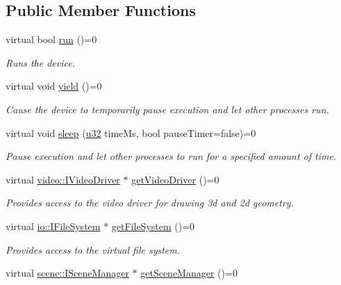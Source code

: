 \subsection*{Public Member Functions}
\begin{DoxyCompactItemize}
\item 
virtual bool \hyperlink{classirr_1_1IrrlichtDevice_a0489f8151dc43f6f41503ffb5a160b35}{run} ()=0
\begin{DoxyCompactList}\small\item\em Runs the device. \end{DoxyCompactList}\item 
virtual void \hyperlink{classirr_1_1IrrlichtDevice_a731727774fad9fc4c6c1c85277ca36dc}{yield} ()=0
\begin{DoxyCompactList}\small\item\em Cause the device to temporarily pause execution and let other processes run. \end{DoxyCompactList}\item 
virtual void \hyperlink{classirr_1_1IrrlichtDevice_a89a3ecebc0e7c5ae08617b78a6e8a9f7}{sleep} (\hyperlink{namespaceirr_a0416a53257075833e7002efd0a18e804}{u32} time\+Ms, bool pause\+Timer=false)=0
\begin{DoxyCompactList}\small\item\em Pause execution and let other processes to run for a specified amount of time. \end{DoxyCompactList}\item 
virtual \hyperlink{classirr_1_1video_1_1IVideoDriver}{video\+::\+I\+Video\+Driver} $\ast$ \hyperlink{classirr_1_1IrrlichtDevice_ada90707ba5c645d47e000e4e0f87c4c4}{get\+Video\+Driver} ()=0
\begin{DoxyCompactList}\small\item\em Provides access to the video driver for drawing 3d and 2d geometry. \end{DoxyCompactList}\item 
virtual \hyperlink{classirr_1_1io_1_1IFileSystem}{io\+::\+I\+File\+System} $\ast$ \hyperlink{classirr_1_1IrrlichtDevice_a3d8d2dee2f57aa7e6c0d14592de3e6ed}{get\+File\+System} ()=0
\begin{DoxyCompactList}\small\item\em Provides access to the virtual file system. \end{DoxyCompactList}\item 
virtual \hyperlink{classirr_1_1scene_1_1ISceneManager}{scene\+::\+I\+Scene\+Manager} $\ast$ \hyperlink{classirr_1_1IrrlichtDevice_a891b503ff4d5041296d88f23f97d7b3d}{get\+Scene\+Manager} ()=0

\end{DoxyCompactItemize}
